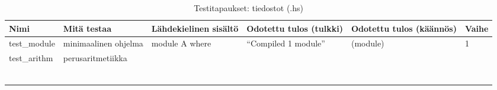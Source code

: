 \documentclass[11pt]{article} %
\begin{document}
\begin{table}[!htbp] %
\caption{Testitapaukset: tiedostot (.hs)}
\begin{tabular}{|p{3cm}|p{3cm}|p{5cm}|p{3cm}|p{3cm}|p{3cm}|}
\hline
\textbf{Nimi} & \textbf{Mitä testaa} & \textbf{Lähdekielinen sisältö} & \textbf{Odotettu tulos (tulkki)} & \textbf{Odotettu tulos (käännös)} & \textbf{Vaihe} \\ \hline
test\_module  &  minimaalinen ohjelma  & module A where &  ``Compiled 1 module''                     &    (module)                 & 1   \\ \hline
 test\_arithm     & perusaritmetiikka         &  &                                  &                                   &                \\ \hline
              &                      &                       &           &                                   &                \\ \hline
              &                      &                       &           &                                   &                \\ \hline
              &                      &                       &           &                                   &                \\ \hline

              &                      &                       &           &                                   &                \\ \hline
              &                      &                       &           &                                   &                \\ \hline
              &                      &                       &           &                                   &                \\ \hline
             
\end{tabular}
\end{table}
\end{document}
